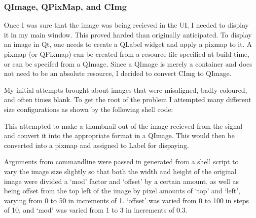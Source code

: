 \documentclass[11pt]{article} %
\begin{document}
{{\subsubsection{QImage, QPixMap, and CImg}
Once I was sure that the image was being recieved in the UI, I needed to display it in my main window. This proved harded than originally anticipated. To display an image in Qt, one needs to create a QLabel widget and apply a pixmap to it. A pixmap (or QPixmap) can be created from a resource file specified at build time, or can be specifed from a QImage. Since a QImage is merely a container and does not need to be an absolute resource, I decided to convert CImg to QImage. 

My initial attempts brought about images that were misaligned, badly coloured, and often times blank. To get the root of the problem I attempted many different size configurations as shown by the following shell code:
\pagebreak
\begin{frame}{}
	\vspace{-20pt}
	
	\label{code:shell1}
\end{frame}
This attempted to make a thumbnail out of the image recieved from the signal and convert it into the appropriate format in a QImage. This would then be converted into a pixmap and assigned to Label for dispaying.

Arguments from commandline were passed in generated from a shell script to vary the image size slightly so that both the width and height of the original image were divided a ‘mod’ factor and ‘offset’ by a certain amount, as well as being offset from the top left of the image by pixel amounts of ‘top’ and ‘left’, varying from 0 to 50 in increments of 1. ‘offset’ was varied from 0 to 100 in steps of 10, and ‘mod’ was varied from 1 to 3 in increments of 0.3.

}}
\end{document}

